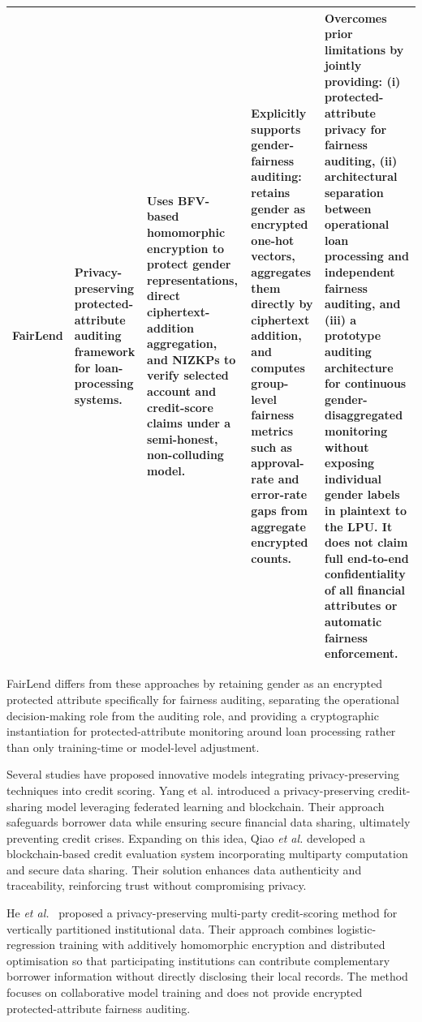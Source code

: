 \documentclass[a4paper,fleqn]{cas-dc}
\begin{document}
\begin{table}[htbp]
\begin{tabular}{|p{1.2cm}|p{2.8cm}|p{2.8cm}|p{2.8cm}|p{4.0cm}|}
\textbf{FairLend} 
& Privacy-preserving protected-attribute auditing framework for loan-processing systems. 
& Uses BFV-based homomorphic encryption to protect gender representations, direct ciphertext-addition aggregation, and NIZKPs to verify selected account and credit-score claims under a semi-honest, non-colluding model.
& Explicitly supports gender-fairness auditing: retains gender as encrypted one-hot vectors, aggregates them directly by ciphertext addition, and computes group-level fairness metrics such as approval-rate and error-rate gaps from aggregate encrypted counts.
& Overcomes prior limitations by jointly providing: (i) protected-attribute privacy for fairness auditing, (ii) architectural separation between operational loan processing and independent fairness auditing, and (iii) a prototype auditing architecture for continuous gender-disaggregated monitoring without exposing individual gender labels in plaintext to the LPU. It does not claim full end-to-end confidentiality of all financial attributes or automatic fairness enforcement. \\
\hline
\end{tabular}
\end{table}

FairLend differs from these approaches by retaining gender as an encrypted protected attribute specifically for fairness auditing, separating the operational decision-making role from the auditing role, and providing a cryptographic instantiation for protected-attribute monitoring around loan processing rather than only training-time or model-level adjustment.


Several studies have proposed innovative models integrating privacy-preserving techniques into credit scoring. Yang et al. \cite{Yang2022privacy} introduced a privacy-preserving credit-sharing model leveraging federated learning and blockchain. Their approach safeguards borrower data while ensuring secure financial data sharing, ultimately preventing credit crises. Expanding on this idea, Qiao \textit{et al.} \cite{qiao2023pevachain} developed a blockchain-based credit evaluation system incorporating multiparty computation and secure data sharing. Their solution enhances data authenticity and traceability, reinforcing trust without compromising privacy.

He \textit{et al.}~\cite{he2023privacy} proposed a privacy-preserving multi-party credit-scoring method for vertically partitioned institutional data. Their approach combines logistic-regression training with additively homomorphic encryption and distributed optimisation so that participating institutions can contribute complementary borrower information without directly disclosing their local records. The method focuses on collaborative model training and does not provide encrypted protected-attribute fairness auditing.
\end{document}
